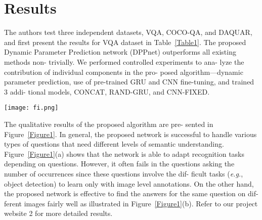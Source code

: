 \documentclass[10pt,twocolumn,letterpaper]{article}
\begin{document}
\section{Results}
The authors test three independent datasets, VQA, COCO-QA,
and DAQUAR, and first present the results for VQA dataset
in Table~\ref{Table1}. The proposed Dynamic Parameter Prediction
network (DPPnet) outperforms all existing methods non-
trivially. We performed controlled experiments to ana-
lyze the contribution of individual components in the pro-
posed algorithm—dynamic parameter prediction, use of
pre-trained GRU and CNN fine-tuning, and trained 3 addi-
tional models, CONCAT, RAND-GRU, and CNN-FIXED.
  \begin{figure*}[!ht]
 \centering
 \texttt{[image: fi.png]}\\
 \caption{\textbf{Sample images and questions in VQA dataset~\cite{name1}. Each question requires a different type and/or level of understanding of the
corresponding input image to find correct answer. Answers in blue are correct while answers in red are incorrect. For the incorrect answers,
ground-truth answers are provided within the parentheses}}\label{Figure1}
 \end{figure*}
The qualitative results of the proposed algorithm are pre-
sented in Figure~\ref{Figure1}. In general, the proposed network is successful to handle various types of questions that need different levels of semantic understanding. Figure~\ref{Figure1}(a) shows that
the network is able to adapt recognition tasks depending on
questions. However, it often fails in the questions asking the
number of occurrences since these questions involve the dif-
ficult tasks (\emph{e.g.}, object detection) to learn only with image level annotations. On the other hand, the proposed network
is effective to find the answers for the same question on dif-
ferent images fairly well as illustrated in Figure~\ref{Figure1}(b). Refer to our project website 2 for more detailed results.


\end{document}
